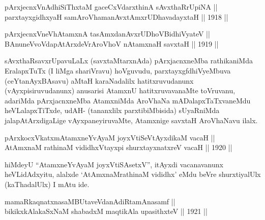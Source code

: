 
\begin{shl}
pArxjecnxVnAdhiSiThxtaM gaceCxVdarxthinA sAvxthaRrUpiNA || \\
parxtayxgidhxyaH samAroVhamanAvxtAmx\s \s rUDhavadayxtaH \hfill || 1918 ||
  
\end{shl}

\begin{shl}
pArxjecnxVneVhA\s \s tamxnA tasAmxdanAvxrUDhoV\s BidhiVyateV ||  \\
\footnotemark[1]BAnuneVvoVdapAtArxdeVrAroVhoV nA\s \s tamxnaH savxtaH \hfill || 1919 ||
  
\end{shl}

\begin{artha}
sAvxthaRsavxrUpavuLaLx (savxtaMtarxnAda) pArxjacnxneMba
rathikaniMda EralapxTuTx (I liMga shariVravu) hoVguvudu, parxtayxgfdhiVyeMbuva (ceYtanAyxBAsavu) aMtaH karaNadalilx hatitxruvudanunx (vAyxpisiruvudanunx) anusarisi AtamxnU hatitxruvavanaMte toVruvanu, adariMda pArxjacnxneMba AtamxniMda AroVhaNa mADalapxTaTxvaneMdu heVLalapxTiTxde, udAH- (tananxlilx parxtibiMbisida) sUyaRniMda jalapAtArxdigaLige vAyxpaneyiruvaMte, Atamxnige savxtaH AroVhaNavu ilalx. 
\end{artha}


\begin{shl}
pArxkocxVkatxmAtamxneYvAyaM joyxVtiSeVtAyxdikaM vacaH || \\
AtAmxnaM rathinaM vididhxVtayxpi shurxtayxnatxreV vacaH \hfill || 1920 ||
  
\end{shl}

\begin{artha}
hiMdeyU ``AtamxneYvAyaM joyxVtiSAsetxV'', itAyxdi vacanavanunx heVLidAdxyitu, alalxde `AtAmxnaMrathinaM vididhx' eMdu beVre shurxtiyalUlx (kaThadalUlx) I mAtu ide.
\end{artha}


\begin{shl}
mamaRkaqnatxnasaMBUtaveVdanAdiRtamAnasamf || \\
bikikxkAlakaSxNaM shabadxM maqtikAla upasithxteV \hfill || 1921 ||
  
\end{shl}

